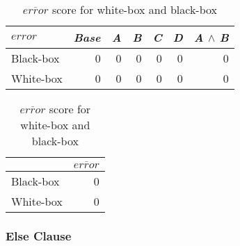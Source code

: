 \begin{table}[H]
\begin{minipage}{.5\linewidth}
    \centering
    \begin{tabular}{lrrrrrr}    \toprule
    $error$     & \emph{Base} & \emph{A} & \emph{B} & \emph{C} & \emph{D} & \emph{A} $\land$ \emph{B}   \\ \midrule
    Black-box & 0 & 0 & 0 & 0 & 0 & 0      \\
    White-box & 0 & 0 & 0 & 0 & 0 & 0      \\ \bottomrule
    \end{tabular}
    \caption{Respective \emph{error} scores for white-box and black-box {\perfInfluenceModel}s for the \emph{Simple Interaction} system.}
\end{minipage}%
\hspace{7mm}
\begin{minipage}{.3\linewidth}
    \centering
    \begin{tabular}{lr}
        \toprule
                  & $\overline{error}$   \\ \midrule
        Black-box & 0              \\
        White-box & 0              \\ \bottomrule
        \end{tabular}  
        \caption{$\overline{error}$ score for white-box and black-box }
    \end{minipage}
\end{table}

\subsubsection*{Else Clause}

